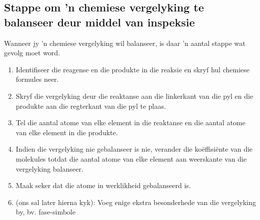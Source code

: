            \subsection*{Stappe om 'n chemiese vergelyking te balanseer deur middel van inspeksie}
            \nopagebreak
Wanneer jy 'n chemiese vergelyking wil balanseer, is daar 'n aantal stappe wat gevolg moet word.
        \label{m38726*id63712}\begin{enumerate}[noitemsep, label=\textbf{Stap \arabic*}:]
\item Identifiseer die reagense en die produkte in die reaksie en skryf hul chemiese formules neer.
\item Skryf die vergelyking deur die reaktanse aan die linkerkant van die pyl en die produkte aan die regterkant van die pyl te plaas.
\item Tel die aantal atome van elke element in die reaktanse en die aantal atome van elke element in die produkte.
\item Indien die vergelyking nie gebalanseer is nie, verander die koëffisiënte van die molekules totdat die aantal atome van elke element aan weerskante van die vergelyking balanseer.
\item Maak seker dat die atome in werklikheid gebalanseerd is.
\item (ons sal later hierna kyk): Voeg enige ekstra besonderhede van die vergelyking by, bv. fase-simbole
\end{enumerate}
\par
            \label{m38726*secfhsst!!!underscore!!!id296}
      \noindent
